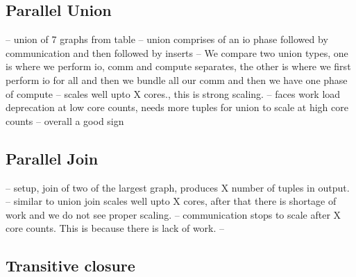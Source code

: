 \subsection{Parallel Union}
\label{sec:union}

-- union of 7 graphs from table
-- union comprises of an io phase followed by communication and then followed by inserts
-- We compare two union types, one is where we perform io, comm and compute separates, the other is where we first perform io for all and then we bundle all our comm and then we have one phase of compute
-- scales well upto X cores., this is strong scaling.
-- faces work load deprecation at low core counts, needs more tuples for union to scale at high core counts
-- overall a good sign


\subsection{Parallel Join}
\label{sec:join}
-- setup, join of two of the largest graph, produces X number of tuples in output.
-- similar to union join scales well upto X cores, after that there is shortage of work and we do not see proper scaling.
-- communication stops to scale after X core counts. This is because there is lack of work.
-- 


\subsection{Transitive closure}
\label{sec:tc}

